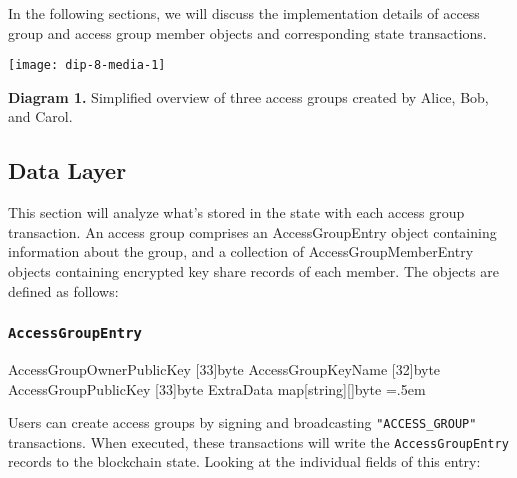 \documentclass[oneside, 12pt]{article}
\newenvironment{lcverbatim}
 {\SaveVerbatim{cverb}}
 {\endSaveVerbatim
  \flushleft\fboxrule=0pt\fboxsep=.5em
  \colorbox{cverbbg}{%
    \makebox[\dimexpr\linewidth-2\fboxsep][l]{\BUseVerbatim{cverb}}%
  }
  \endflushleft
}
\begin{document}
In the following sections, we will discuss the implementation details of access group and access group member objects and corresponding state transactions.

\texttt{[image: dip-8-media-1]}
\begin{center}
    \begin{footnotesize}
    \textbf{Diagram 1.} Simplified overview of three access groups created by Alice, Bob, and Carol.
    \end{footnotesize}
\end{center}

\subsection{Data Layer}
This section will analyze what’s stored in the state with each access group transaction. An access group comprises an AccessGroupEntry object containing information about the group, and a collection of AccessGroupMemberEntry objects containing encrypted key share records of each member. The objects are defined as follows:

\subsubsection{\texttt{AccessGroupEntry}}
\begin{lcverbatim}
{
   AccessGroupOwnerPublicKey [33]byte
   AccessGroupKeyName        [32]byte
   AccessGroupPublicKey      [33]byte
   ExtraData                 map[string][]byte
}
\end{lcverbatim}

Users can create access groups by signing and broadcasting \texttt{"ACCESS\_GROUP"} transactions. When executed, these transactions will write the \texttt{AccessGroupEntry} records to the blockchain state. Looking at the individual fields of this entry:
\end{document}
